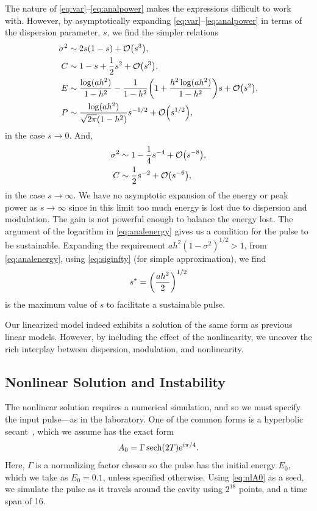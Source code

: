 \documentclass[9pt,twocolumn,twoside]{osajnl}
\let\originalleft\left
\let\originalright\right
\renewcommand{\left}{\mathopen{}\mathclose\bgroup\originalleft}
\renewcommand{\right}{\aftergroup\egroup\originalright}
\providecommand{\bigO}[1]{\ensuremath{\mathop{}\mathopen{}\mathcal{O}\mathopen{}\left(#1\right)}} %
\DeclareMathOperator{\sech}{sech}
\begin{document}
The nature of \eqref{eq:var}--\eqref{eq:analpower} makes the expressions difficult to work with. However, by asymptotically expanding \eqref{eq:var}--\eqref{eq:analpower} in terms of the dispersion parameter, $s$, we find the simpler relations
\begin{align}
	\sigma^2 &\sim 2s(1 - s) + \bigO{s^3}, \\
	C &\sim 1 - s + \frac{1}{2}s^2 + \bigO{s^3}, \\
	E &\sim \frac{\log (a h^2)}{1 - h^2} - \frac{1}{1 - h^2} \left( 1 + \frac{h^2 \log(a h^2)}{1 - h^2}  \right) s + \bigO{s^2}, \label{eq:maxenergy} \\
	P &\sim \frac{\log(ah^2)}{\sqrt{2 \pi}(1 - h^2)} s^{-1/2} + \bigO{s^{1/2}},
\end{align}
in the case $s \rightarrow 0$. And,
\begin{align}
	\sigma^2 &\sim 1 - \frac{1}{4}s^{-4} + \bigO{s^{-8}}, \label{eq:siginfty}\\
	C &\sim \frac{1}{2}s^{-2} + \bigO{s^{-6}},
\end{align}
in the case $s \rightarrow \infty$. We have no asymptotic expansion of the energy or peak power as $s \rightarrow \infty$ since in this limit too much energy is lost due to dispersion and modulation. The gain is not powerful enough to balance the energy lost. The argument of the logarithm in \eqref{eq:analenergy} gives us a condition for the pulse to be sustainable. Expanding the requirement $a h^2 (1 - \sigma^2)^{1/2} > 1$, from \eqref{eq:analenergy}, using \eqref{eq:siginfty} (for simple approximation), we find 
\begin{align}
	s^* = \left( \frac{a h^2}{2} \right)^{1/2}
\end{align}
is the maximum value of $s$ to facilitate a sustainable pulse.

Our linearized model indeed exhibits a solution of the same form as previous linear models. However, by including the effect of the nonlinearity, we uncover the rich interplay between dispersion, modulation, and nonlinearity.

\subsection{Nonlinear Solution and Instability}
\label{sec:nlresults}
The nonlinear solution requires a numerical simulation, and so we must specify the input pulse---as in the laboratory. One of the common forms is a hyperbolic secant~\cite{coen1997, finot2008, rothenberg1989b, tomlinson1984}, which we assume has the exact form
\begin{align}
	A_0 = \Gamma \sech \left( 2 T \right) \textrm{e}^{i \pi / 4}.
	\label{eq:nlA0}
\end{align}
Here, $\Gamma$ is a normalizing factor chosen so the pulse has the initial energy $E_0$, which we take as $E_0 = 0.1$, unless specified otherwise. Using \eqref{eq:nlA0} as a seed, we simulate the pulse as it travels around the cavity using $2^{18}$ points, and a time span of 16.
\end{document}
